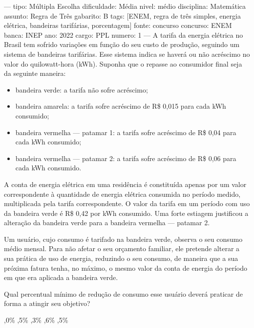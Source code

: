 
---
tipo: Múltipla Escolha
dificuldade: Média
nivel: médio
disciplina: Matemática
assunto: Regra de Três
gabarito: B
tags: [ENEM, regra de três simples, energia elétrica, bandeiras tarifárias, porcentagem]
fonte: concurso
concurso: ENEM
banca: INEP
ano: 2022
cargo: PPL
numero: 1
---
\question
A tarifa da energia elétrica no Brasil tem sofrido variações em função do seu custo de produção, seguindo um sistema de bandeiras tarifárias. Esse sistema indica se haverá ou não acréscimo no valor do quilowatt-hora (kWh). Suponha que o repasse ao consumidor final seja da seguinte maneira:

\begin{itemize}
\item bandeira verde: a tarifa não sofre acréscimo;
\item bandeira amarela: a tarifa sofre acréscimo de R\$ 0,015 para cada kWh consumido;
\item bandeira vermelha --- patamar 1: a tarifa sofre acréscimo de R\$ 0,04 para cada kWh consumido;
\item bandeira vermelha --- patamar 2: a tarifa sofre acréscimo de R\$ 0,06 para cada kWh consumido.
\end{itemize}

A conta de energia elétrica em uma residência é constituída apenas por um valor correspondente à quantidade de energia elétrica consumida no período medido, multiplicada pela tarifa correspondente. O valor da tarifa em um período com uso da bandeira verde é R\$ 0,42 por kWh consumido. Uma forte estiagem justificou a alteração da bandeira verde para a bandeira vermelha --- patamar 2.

Um usuário, cujo consumo é tarifado na bandeira verde, observa o seu consumo médio mensal. Para não afetar o seu orçamento familiar, ele pretende alterar a sua prática de uso de energia, reduzindo o seu consumo, de maneira que a sua próxima fatura tenha, no máximo, o mesmo valor da conta de energia do período em que era aplicada a bandeira verde.

Qual percentual mínimo de redução de consumo esse usuário deverá praticar de forma a atingir seu objetivo?
\begin{choices}
,0\%
,5\%
,3\%
,6\%
,5\%
\end{choices}

